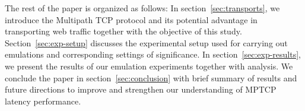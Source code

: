 The rest of the paper is organized as follows: In section~\ref{sec:transports}, we introduce the Multipath TCP protocol and its potential advantage in transporting
web traffic together with the objective of this study. Section~\ref{sec:exp-setup} discusses the experimental setup used for carrying out emulations and
corresponding settings of significance. In section~\ref{sec:exp-results}, we present the results of our emulation experiments together with analysis.
We conclude the paper in section~\ref{sec:conclusion} with brief summary of results and future directions to improve and strengthen our understanding of 
MPTCP latency performance.

